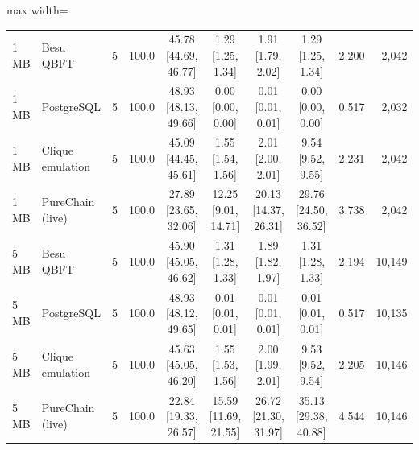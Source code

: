 \begin{table}[t]
\begin{adjustbox}{max width=\textwidth}
\begin{tabular}{llrrcccccr}
1\,MB & Besu QBFT & 5 & 100.0 & 45.78 [44.69, 46.77] & 1.29 [1.25, 1.34] & 1.91 [1.79, 2.02] & 1.29 [1.25, 1.34] & 2.200 & 2,042 \\
1\,MB & PostgreSQL & 5 & 100.0 & 48.93 [48.13, 49.66] & 0.00 [0.00, 0.00] & 0.01 [0.01, 0.01] & 0.00 [0.00, 0.00] & 0.517 & 2,032 \\
1\,MB & Clique emulation & 5 & 100.0 & 45.09 [44.45, 45.61] & 1.55 [1.54, 1.56] & 2.01 [2.00, 2.01] & 9.54 [9.52, 9.55] & 2.231 & 2,042 \\
1\,MB & PureChain (live) & 5 & 100.0 & 27.89 [23.65, 32.06] & 12.25 [9.01, 14.71] & 20.13 [14.37, 26.31] & 29.76 [24.50, 36.52] & 3.738 & 2,042 \\
5\,MB & Besu QBFT & 5 & 100.0 & 45.90 [45.05, 46.62] & 1.31 [1.28, 1.33] & 1.89 [1.82, 1.97] & 1.31 [1.28, 1.33] & 2.194 & 10,149 \\
5\,MB & PostgreSQL & 5 & 100.0 & 48.93 [48.12, 49.65] & 0.01 [0.01, 0.01] & 0.01 [0.01, 0.01] & 0.01 [0.01, 0.01] & 0.517 & 10,135 \\
5\,MB & Clique emulation & 5 & 100.0 & 45.63 [45.05, 46.20] & 1.55 [1.53, 1.56] & 2.00 [1.99, 2.01] & 9.53 [9.52, 9.54] & 2.205 & 10,146 \\
5\,MB & PureChain (live) & 5 & 100.0 & 22.84 [19.33, 26.57] & 15.59 [11.69, 21.55] & 26.72 [21.30, 31.97] & 35.13 [29.38, 40.88] & 4.544 & 10,146 \\
\bottomrule
\end{tabular}\end{adjustbox}
\end{table}
